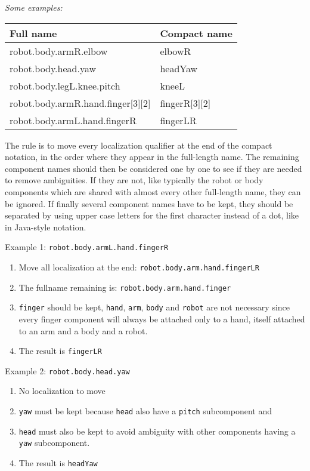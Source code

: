 \documentclass[a4paper]{article}
\begin{document}
{\itshape
Some examples:

\begin{flushleft}
\tablehead{}
\begin{supertabular}{|m{9.008cm}|m{5.533cm}|}
\hline
\sffamily Full name &
\sffamily Compact name\\\hline
\ttfamily robot.body.armR.elbow &
\ttfamily elbowR\\\hline
\ttfamily robot.body.head.yaw &
\ttfamily headYaw\\\hline
\ttfamily robot.body.legL.knee.pitch &
\ttfamily kneeL\\\hline
\ttfamily robot.body.armR.hand.finger[3][2] &
\ttfamily fingerR[3][2]\\\hline
\ttfamily robot.body.armL.hand.fingerR &
\ttfamily fingerLR\\\hline
\end{supertabular}
\end{flushleft}

The rule is to move every localization qualifier at the end of the
compact notation, in the order where they appear in the full-length
name. The remaining component names should then be considered one by
one to see if they are needed to remove ambiguities. If they are not,
like typically the robot or body components which are shared with
almost every other full-length name, they can be ignored. If finally
several component names have to be kept, they should be separated by
using upper case letters for the first character instead of a dot, like
in Java-style notation.}


Example 1: \texttt{robot.body.armL.hand.fingerR}


\begin{enumerate}
\item
Move all localization at the end: \texttt{robot.body.arm.hand.fingerLR}
\item
The fullname remaining is: \texttt{robot.body.arm.hand.finger}
\item
\texttt{finger} should be kept, \texttt{hand}, \texttt{arm},
\texttt{body} and \texttt{robot} are not necessary since every finger
component will always be attached only to a hand, itself attached to an
arm and a body and a robot.
\item
The result is \texttt{fingerLR}
\end{enumerate}

Example 2: \texttt{robot.body.head.yaw}


\begin{enumerate}
\item
No localization to move
\item
\texttt{yaw} must be kept because \texttt{head} also have a
\texttt{pitch} subcomponent and
\item
\texttt{head} must also be kept to avoid ambiguity with other components
having a \texttt{yaw} subcomponent.
\item
The result is \texttt{headYaw}
\end{enumerate}
\end{document}

